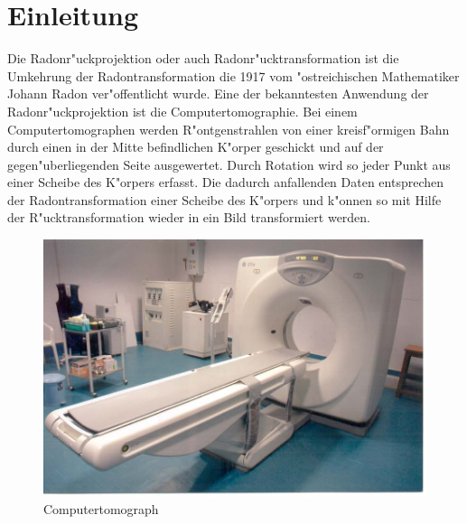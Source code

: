 \section{Einleitung}

Die Radonr"uckprojektion oder auch Radonr"ucktransformation ist
die Umkehrung der Radontransformation die 1917 vom "ostreichischen
Mathematiker Johann Radon ver"offentlicht wurde. Eine der bekanntesten
Anwendung der Radonr"uckprojektion ist die Computertomographie. Bei einem
Computertomographen werden R"ontgenstrahlen von einer kreisf"ormigen
Bahn durch einen in der Mitte befindlichen K"orper geschickt und auf
der gegen"uberliegenden Seite ausgewertet. Durch Rotation wird so jeder
Punkt aus einer Scheibe des K"orpers erfasst. Die dadurch anfallenden
Daten entsprechen der Radontransformation einer Scheibe des K"orpers
und k"onnen so mit Hilfe der R"ucktransformation wieder in ein Bild
transformiert werden.


\begin{figure}[ht!]\centering
	\begin{adjustbox}{scale=0.5, keepaspectratio}
		\includegraphics{radon/images/tomograph.jpg}
	\end{adjustbox}
	\caption{Computertomograph}
\end{figure}
\FloatBarrier
